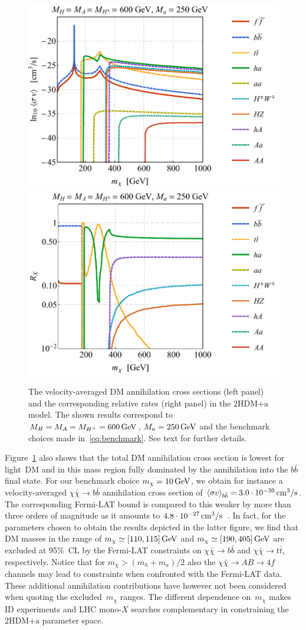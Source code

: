 \documentclass[a4paper, 11pt,notoc]{article}
\newcommand{\hdma}{\ensuremath{\textrm{2HDM+a}}\xspace}
\begin{document}
\begin{figure}[t!]
\centering
\includegraphics[height=0.4\textwidth]{IDbenchmark.pdf} \quad 
\includegraphics[height=0.4\textwidth]{addIDbenchmark.pdf}
\vspace{4mm}
\caption{The velocity-averaged DM annihilation cross sections  (left panel) and the corresponding relative rates (right panel) in the \hdma model. The shown results correspond to $M_H = M_A = M_{H^\pm} = 600 \, {\rm GeV}$, $M_a = 250 \, {\rm GeV}$ and the benchmark choices made in~\eqref{eq:benchmark}. See text for further details. }
\label{fig:IDbenchmark}
\end{figure}

Figure~\ref{fig:IDbenchmark} also shows that the total DM annihilation cross section is lowest for light~DM and in this mass region fully dominated by the annihilation into the $b \bar b$ final state. For our benchmark choice $m_\chi = 10 \, {\rm GeV}$, we obtain  for instance a velocity-averaged $\chi \bar \chi \to b \bar b$ annihilation cross section   of  $\langle \sigma v \rangle_{b \bar b} = 3.0 \cdot 10^{-30} \, {\rm cm}^3/{\rm s}$. The corresponding Fermi-LAT bound is compared to this weaker by more than three orders of magnitude as it amounts to $4.8 \cdot 10^{-27} \, {\rm cm}^3/{\rm s}$~\cite{Fermi-LAT:2016uux}.  In fact, for the parameters chosen to obtain the results depicted in the latter figure, we find that DM masses in the range of $m_\chi \simeq [110, 115] \, {\rm GeV}$ and $m_\chi \simeq [190, 405] \, {\rm GeV}$ are excluded at 95\%~CL by the Fermi-LAT constraints on $\chi \bar \chi \to b \bar b$ and $\chi \bar \chi \to t \bar t$, respectively. Notice that for $m_\chi > (m_h + m_a)/2$ also the $\chi \bar \chi \to A B \to 4f$ channels may lead to constraints when confronted with the Fermi-LAT data. These additional annihilation contributions have however not been considered when quoting the excluded~$m_\chi$ ranges. The different dependence on~$m_\chi$ makes ID experiments and LHC mono-$X$ searches    complementary in constraining the \hdma parameter space. 
\end{document}
